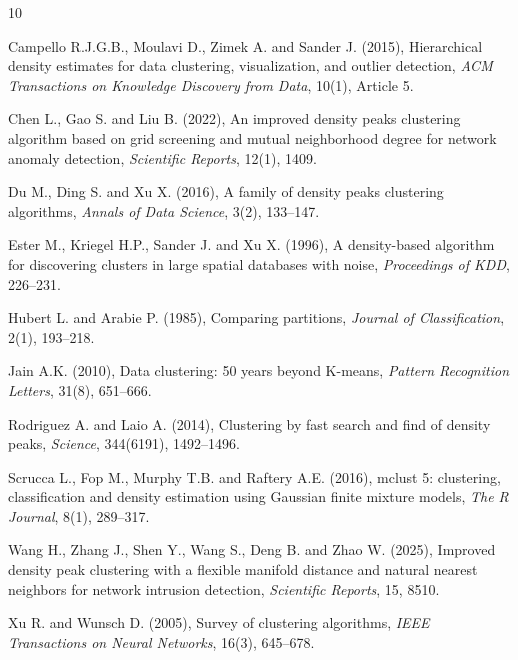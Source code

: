 \documentclass[twoside]{article}
\begin{document}
\begin{thebibliography}{10}
	
	
	Campello R.J.G.B., Moulavi D., Zimek A. and Sander J. (2015), Hierarchical density estimates for data clustering, visualization, and outlier detection, {\it ACM Transactions on Knowledge Discovery from Data}, 10(1), Article 5.
	
	Chen L., Gao S. and Liu B. (2022), An improved density peaks clustering algorithm based on grid screening and mutual neighborhood degree for network anomaly detection, {\it Scientific Reports}, 12(1), 1409.
	
	Du M., Ding S. and Xu X. (2016), A family of density peaks clustering algorithms, {\it Annals of Data Science}, 3(2), 133--147.
	
	Ester M., Kriegel H.P., Sander J. and Xu X. (1996), A density-based algorithm for discovering clusters in large spatial databases with noise, {\it Proceedings of KDD}, 226--231.
	
	Hubert L. and Arabie P. (1985), Comparing partitions, {\it Journal of Classification}, 2(1), 193--218.
	
	Jain A.K. (2010), Data clustering: 50 years beyond K-means, {\it Pattern Recognition Letters}, 31(8), 651--666.
	
	
	Rodriguez A. and Laio A. (2014), Clustering by fast search and find of density peaks, {\it Science}, 344(6191), 1492--1496.
	
	Scrucca L., Fop M., Murphy T.B. and Raftery A.E. (2016), mclust 5: clustering, classification and density estimation using Gaussian finite mixture models, {\it The R Journal}, 8(1), 289--317.
	
	Wang H., Zhang J., Shen Y., Wang S., Deng B. and Zhao W. (2025), Improved density peak clustering with a flexible manifold distance and natural nearest neighbors for network intrusion detection, {\it Scientific Reports}, 15, 8510.
	
	Xu R. and Wunsch D. (2005), Survey of clustering algorithms, {\it IEEE Transactions on Neural Networks}, 16(3), 645--678.
	
\end{thebibliography}
\end{document}
